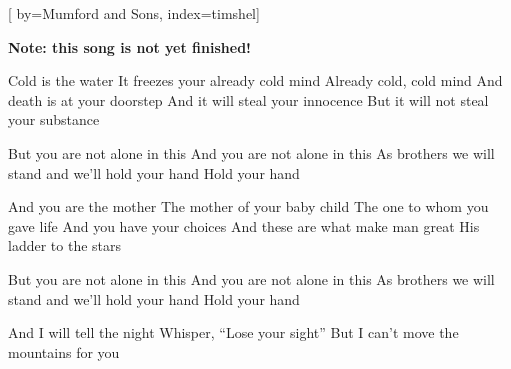 
[%
    by={Mumford and Sons},
    index={timshel}]


    \label{timshel}

    \textbf{Note: this song is not yet finished!}

    \beginverse
        Cold is the water
        It freezes your already cold mind
        Already cold, cold mind
        And death is at your doorstep
        And it will steal your innocence
        But it will not steal your substance
    \endverse

    \beginchorus
        But you are not alone in this
        And you are not alone in this
        As brothers we will stand and we'll hold your hand
        Hold your hand
    \endchorus

    \beginverse
        And you are the mother
        The mother of your baby child
        The one to whom you gave life
        And you have your choices
        And these are what make man great
        His ladder to the stars
    \endverse

    \beginchorus
        But you are not alone in this
        And you are not alone in this
        As brothers we will stand and we'll hold your hand
        Hold your hand
    \endchorus

    \beginverse*
        And I will tell the night
        Whisper, ``Lose your sight''
        But I can't move the mountains for you
    \endverse
\endsong
